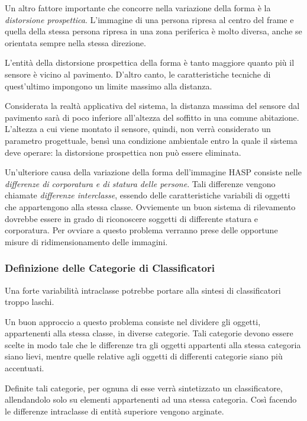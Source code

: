                 Un altro fattore importante che concorre nella variazione della forma è la \emph{distorsione prospettica}.
                L'immagine di una persona ripresa al centro del frame e quella della stessa persona ripresa in una zona periferica è molto diversa, anche se orientata sempre nella stessa direzione.

                L'entità della distorsione prospettica della forma è tanto maggiore quanto più il sensore è vicino al pavimento. 
                D'altro canto, le caratteristiche tecniche di quest'ultimo impongono un limite massimo alla distanza.
                
                Considerata la realtà applicativa del sistema, la distanza massima del sensore dal pavimento sarà di poco inferiore all'altezza del soffitto in una comune abitazione.
                L'altezza a cui viene montato il sensore, quindi, non verrà considerato un parametro progettuale, bensì una condizione ambientale entro la quale il sistema deve operare: la distorsione prospettica non può essere eliminata.

                Un'ulteriore causa della variazione della forma dell'immagine HASP consiste nelle \emph{differenze di corporatura e di statura delle persone}.
                Tali differenze vengono chiamate \emph{differenze interclasse}, essendo delle caratteristiche variabili di oggetti che appartengono alla stessa classe.
                Ovviemente un buon sistema di rilevamento dovrebbe essere in grado di riconoscere soggetti di differente statura e corporatura.
                Per ovviare a questo problema verranno prese delle opportune misure di ridimensionamento delle immagini.

            \subsubsection{Definizione delle Categorie di Classificatori}
                Una forte variabilità intraclasse potrebbe portare alla sintesi di classificatori troppo laschi.

                Un buon approccio a questo problema consiste nel dividere gli oggetti, appartenenti alla stessa classe, in diverse categorie.
                Tali categorie devono essere scelte in modo tale che le differenze tra gli oggetti appartenti alla stessa categoria siano lievi, mentre quelle relative agli oggetti di differenti categorie siano più accentuati.
                
                Definite tali categorie, per ognuna di esse verrà sintetizzato un classificatore, allendandolo solo su elementi appartenenti ad una stessa categoria.
                Così facendo le differenze intraclasse di entità superiore vengono arginate.

